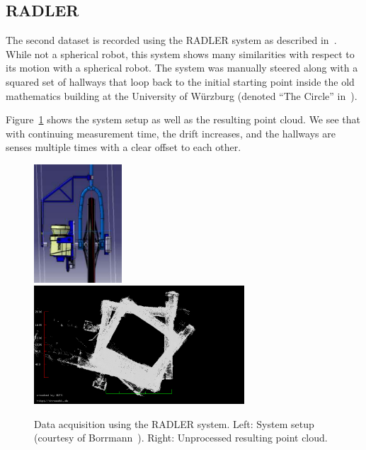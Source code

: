 	\subsection{RADLER}

	The second dataset is recorded using the RADLER system as described in~\cite{Borrmann2020-RADLER}.
	While not a spherical robot, this system shows many similarities with respect to its motion with a spherical robot.
	The system was manually steered along with a squared set of hallways that loop back to the initial starting point inside the old mathematics building at the University of Würzburg (denoted ``The Circle'' in~\cite{Borrmann2020-RADLER}).

	Figure~\ref{fig:radler-mathe} shows the system setup as well as the resulting point cloud.
	We see that with continuing measurement time, the drift increases, and the hallways are senses multiple times with a clear offset to each other. 

	\begin{figure}
		\centering
		\begin{minipage}[c]{\textwidth}
			\includegraphics[width=0.2925\textwidth]{./images/radler_setup}\hfill
			\includegraphics[width=0.7\textwidth]{./images/mathe_top_view}
		\end{minipage}
		\caption{Data acquisition using the RADLER system. Left: System setup (courtesy of Borrmann~\cite{Borrmann2020-RADLER}). Right: Unprocessed resulting point cloud.}
		\label{fig:radler-mathe}
	\end{figure}

